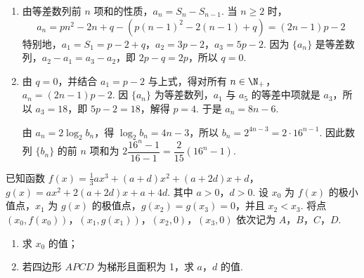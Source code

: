 \begin{solution}
\begin{enumerate}
    \item 由等差数列前 \(n\) 项和的性质，\(a_n=S_n-S_{n-1}\). 当 \(n\geqslant2\) 时，
    \[
    a_n=pn^2-2n+q-\left(p(n-1)^2-2(n-1)+q\right)=(2n-1)p-2
    \]
    特别地，\(a_1=S_1=p-2+q\)，\(a_2=3p-2\)，\(a_3=5p-2\). 因为 \(\{a_n\}\) 是等差数列，\(a_2-a_1=a_3-a_2\)，即 \(2p-q=2p\)，所以 \(q=0\).
    \item 由 \(q=0\)，并结合 \(a_1=p-2\) 与上式，得对所有 \(n\in\N_+\)，\(a_n=(2n-1)p-2\). 因 \(\{a_n\}\) 为等差数列，\(a_1\) 与 \(a_5\) 的等差中项就是 \(a_3\)，所以 \(a_3=18\)，即 \(5p-2=18\)，解得 \(p=4\). 于是 \(a_n=8n-6\).

由 \(a_n=2\log_2 b_n\)，得 \(\log_2 b_n=4n-3\)，所以 \(b_n=2^{4n-3}=2\cdot16^{n-1}\). 因此数列 \(\{b_n\}\) 的前 \(n\) 项和为 \(2\dfrac{16^n-1}{16-1}=\dfrac{2}{15}(16^n-1)\).
\end{enumerate}
\end{solution}

\begin{problem}
已知函数 \( f(x) = \frac{1}{3} ax^3 + (a + d)x^2 + (a + 2d)x + d \)，\( g(x) = ax^2 + 2(a + 2d)x + a + 4d \). 其中 \( a > 0 \)，\( d > 0 \). 设 \( x_0 \) 为 \( f(x) \) 的极小值点，\( x_1 \) 为 \( g(x) \) 的极值点，\( g(x_2) = g(x_3) = 0 \)，并且 \( x_2 < x_3 \). 将点 \( (x_0, f(x_0)) \)，\( (x_1, g(x_1)) \)，\( (x_2, 0) \)，\( (x_3, 0) \) 依次记为 \(A\)，\(B\)，\(C\)，\(D\).

\begin{enumerate}
\item 求 \(x_0\) 的值；
\item 若四边形 \(APCD\) 为梯形且面积为 1，求 \(a\)，\(d\) 的值.
\end{enumerate}
\end{problem}

